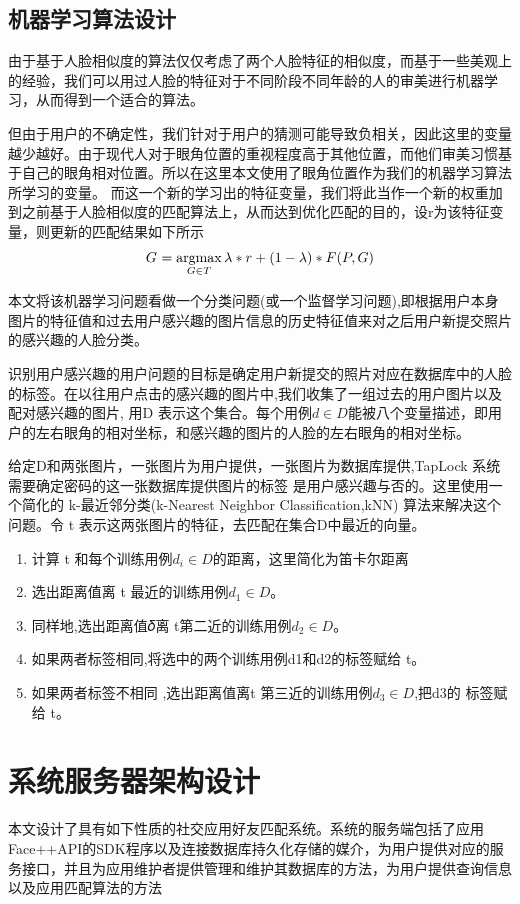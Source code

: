 \subsection{机器学习算法设计}
由于基于人脸相似度的算法仅仅考虑了两个人脸特征的相似度，而基于一些美观上的经验，我们可以用过人脸的特征对于不同阶段不同年龄的人的审美进行机器学习，从而得到一个适合的算法。

但由于用户的不确定性，我们针对于用户的猜测可能导致负相关，因此这里的变量越少越好。由于现代人对于眼角位置的重视程度高于其他位置，而他们审美习惯基于自己的眼角相对位置。所以在这里本文使用了眼角位置作为我们的机器学习算法所学习的变量。
而这一个新的学习出的特征变量，我们将此当作一个新的权重加到之前基于人脸相似度的匹配算法上，从而达到优化匹配的目的，设r为该特征变量，则更新的匹配结果如下所示
\begin{equation*}
G^{\*} = \mathop{\argmax_{G \in T}}{\lambda * r+(1-\lambda)* F(P,G)}
\end{equation*}

本文将该机器学习问题看做一个分类问题(或一个监督学习问题),即根据用户本身图片的特征值和过去用户感兴趣的图片信息的历史特征值来对之后用户新提交照片的感兴趣的人脸分类。

识别用户感兴趣的用户问题的目标是确定用户新提交的照片对应在数据库中的人脸的标签。在以往用户点击的感兴趣的图片中,我们收集了一组过去的用户图片以及配对感兴趣的图片, 用D 表示这个集合。每个用例$d \in D$能被八个变量描述，即用户的左右眼角的相对坐标，和感兴趣的图片的人脸的左右眼角的相对坐标。

给定D和两张图片，一张图片为用户提供，一张图片为数据库提供,TapLock 系统需要确定密码的这一张数据库提供图片的标签 是用户感兴趣与否的。这里使用一个简化的 k-最近邻分类(k-Nearest Neighbor Classification,kNN)\parencite{ML1}\parencite{ML2}\parencite{ML3} 算法来解决这个问题。令 t 表示这两张图片的特征，去匹配在集合D中最近的向量。
\begin{enumerate}
\item 计算 t 和每个训练用例$d_{i} \in D$的距离，这里简化为笛卡尔距离
\item 选出距离值离 t 最近的训练用例$d_{1} \in D$。
\item 同样地,选出距离值𝛿离 t第二近的训练用例$d_{2} \in D$。
\item 如果两者标签相同,将选中的两个训练用例d1和d2的标签赋给 t。
\item 如果两者标签不相同 ,选出距离值离t 
第三近的训练用例$d_{3} \in D$,把d3的
标签赋给 t。
\end{enumerate}

\section{系统服务器架构设计}
本文设计了具有如下性质的社交应用好友匹配系统。系统的服务端包括了应用Face++API的SDK程序以及连接数据库持久化存储的媒介，为用户提供对应的服务接口，并且为应用维护者提供管理和维护其数据库的方法，为用户提供查询信息以及应用匹配算法的方法

